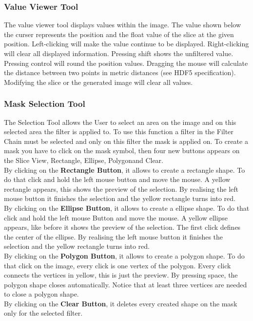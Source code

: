 \subsubsection{Value Viewer Tool}
The value viewer tool displays values within the image. The value shown below the curser represents the position and the float value of the slice at the given position. Left-clicking will make the value continue to be displayed. Right-clicking will clear all displayed information. Pressing shift shows the unfiltered value. Pressing control will round the position values. Dragging the mouse will calculate the distance between two points in metric distances (see HDF5 specification). Modifying the slice or the generated image will clear all values.

\subsubsection{Mask Selection Tool}
\label{sec:mask}
The Selection Tool allows the User to select an area on the image and on this selected area the filter is applied to. To use this function a filter in the Filter Chain must be selected and only on this filter the mask is applied on. To create a mask you have to click on the mask symbol, then four new buttons appears on the Slice View, \grqq Rectangle\grqq, \grqq Ellipse\grqq, \grqq Polygon\grqq and \grqq Clear\grqq.
\\[12pt]
By clicking on the \textbf{Rectangle Button}, it allows to create a rectangle shape. To do that click and hold the left mouse button and move the mouse. A yellow rectangle appears, this shows the preview of the selection. By realising the left mouse button it finishes the selection and the yellow rectangle turns into red.
\\[12pt]
By clicking on the \textbf{Ellipse Button}, it allows to create a ellipse shape. To do that click and hold the left mouse Button and move the mouse. A yellow ellipse appears, like before it shows the preview of the selection. The first click defines the center of the ellipse. By realising the left mouse button it finishes the selection and the yellow rectangle turns into red.
\\[12pt]
By clicking on the \textbf{Polygon Button}, it allows to create a polygon shape. To do that click on the image, every click is one vertex of the polygon. Every click connects the vertices in yellow, this is just the preview. By pressing space, the polygon shape closes automatically. Notice that at least three vertices are needed to close a polygon shape.
\\[12pt]
By clicking on the \textbf{Clear Button}, it deletes every created shape on the mask only for the selected filter.

